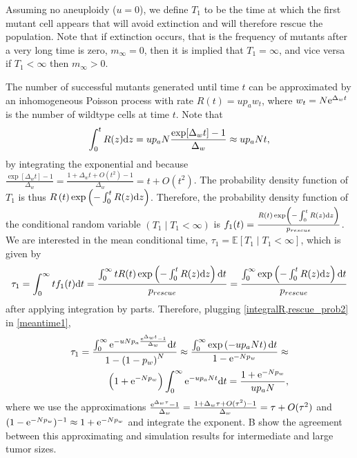 \documentclass[12pt]{extarticle}
\renewcommand{\d}[1]{\ensuremath{\operatorname{d}\!{#1}}}
\renewcommand{\d}{{\rm d}}
\newcommand{\e}{{\rm e}}
\begin{document}
Assuming no aneuploidy ($u=0$), we define $T_1$ to be the time at which the first mutant cell appears that will avoid extinction and will therefore rescue the population.
Note that if extinction occurs, that is the frequency of mutants after a very long time is zero, $m_{\infty}=0$, then it is implied that $T_1=\infty$, and vice versa if $T_1<\infty$ then $m_{\infty}>0$.

The number of successful mutants generated until time $t$ can be approximated by an inhomogeneous Poisson process with rate $R\left(t\right) = u p_a w_t$,
where $w_t=N\e^{\Delta_w t}$ is the number of wildtype cells at time $t$.
Note that 
\begin{equation}\label{integralR}
\int_0^{t}{R(z)\d z} = 
u p_a N \frac{\exp[{\Delta_w t}]-1}{\Delta_w} \approx 
u p_a N t,
\end{equation}
by integrating the exponential and because $\frac{\exp[\Delta_w t]-1}{\Delta_w}=\frac{1+\Delta_w t+O(t^2)-1}{\Delta_w}=t+O(t^2)$.
The probability density function of $T_1$ is thus
$R\left(t\right)\exp\left(-\int_0^{t}{R(z)\d z}\right)$. %
Therefore, the probability density function of the conditional random variable $(T_1 \mid T_1 < \infty)$ is
$f_1(t) = \frac{R\left(t\right)\exp\left(-\int_0^{t}{R(z)\d z}\right)}{p_{rescue}}$. 
\\

We are interested in the mean conditional time, $\tau_1=\mathbb{E}\left[T_1 \mid T_1<\infty\right]$, which is given by
\begin{equation}\label{meantime1}
\begin{aligned}
\tau_1 =
\int_{0}^{\infty}{t f_1(t) \d t} = 
\frac{\int_{0}^{\infty}{tR(t)\exp\left(-\int_0^{t}{R(z)\d z}\right) \d t}}{p_{rescue}} = 
\frac{\int_{0}^{\infty}{\exp\left(-\int_0^{t}{R(z)\d z}\right) \d t}}{p_{rescue}}
\end{aligned}
\end{equation}
after applying integration by parts.
Therefore, plugging \cref{integralR,rescue_prob2} in \cref{meantime1}, 
\begin{align}\label{limitapprox}
\tau_1 = 
\frac{\int_0^\infty\e^{-uNp_a\frac{\e^{\Delta_w t}-1}{\Delta_w}} \d t}{1-\left(1-p_w\right)^N} \approx
\frac{\int_{0}^{\infty}{\exp\left(-u p_a N t\right) \d t}}{1-\e^{-Np_w}} \approx \\
\left(1+\e^{-Np_w}\right)\int_0^\infty\e^{-u p_a N t} \d t =
\frac{1+\e^{-Np_w}}{u p_a N} ,
\end{align}
where we use the approximations 
$\frac{\e^{\Delta_w\tau}-1}{\Delta_w}=\frac{1+\Delta_w\tau+O(\tau^2)-1}{\Delta_w}=\tau+O(\tau^2)$ and $(1-\e^{-Np_w})^{-1} \approx 1+\e^{-Np_w}$ and integrate the exponent.
B show the agreement between this approximating and simulation results for intermediate and large tumor sizes.
\\
\end{document}
